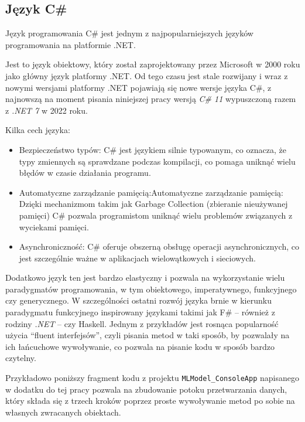 \subsection{Język C\#}

Język programowania C\# jest jednym z najpopularniejszych języków programowania na platformie .NET.

Jest to język obiektowy, który został zaprojektowany przez Microsoft w 2000 roku jako główny język platformy .NET.
Od tego czasu jest stale rozwijany i wraz z nowymi wersjami platformy .NET pojawiają się nowe wersje języka C\#, z najnowszą na moment pisania niniejszej pracy wersją \emph{C\# 11} wypuszczoną razem z \emph{.NET 7} w 2022 roku.

Kilka cech języka:

\begin{itemize}

  \item Bezpieczeństwo typów: C\# jest językiem silnie typowanym, co oznacza, że typy zmiennych są sprawdzane podczas kompilacji, co pomaga uniknąć wielu błędów w czasie działania programu.

  \item Automatyczne zarządzanie pamięcią:Automatyczne zarządzanie pamięcią: Dzięki mechanizmom takim jak Garbage Collection (zbieranie nieużywanej pamięci) C\# pozwala programistom uniknąć wielu problemów związanych z wyciekami pamięci.

  \item Asynchroniczność: C\# oferuje obszerną obsługę operacji asynchronicznych, co jest szczególnie ważne w aplikacjach wielowątkowych i sieciowych.

\end{itemize}

Dodatkowo język ten jest bardzo elastyczny i pozwala na wykorzystanie wielu paradygmatów programowania, w tym obiektowego, imperatywnego, funkcyjnego czy generycznego.
W szczególności ostatni rozwój języka brnie w kierunku paradygmatu funkcyjnego inspirowany językami takimi jak F\# -- również z rodziny \emph{.NET} -- czy Haskell.
Jednym z przykładów jest rosnąca popularność użycia ``fluent interfejsów'', czyli pisania metod w taki sposób, by pozwalały na ich łańcuchowe wywoływanie, co pozwala na pisanie kodu w sposób bardzo czytelny.

Przykładowo poniższy fragment kodu z projektu \lstinline{MLModel_ConsoleApp} napisanego w dodatku do tej pracy pozwala na zbudowanie potoku przetwarzania danych, który składa się z trzech kroków poprzez proste wywoływanie metod po sobie na własnych zwracanych obiektach.

